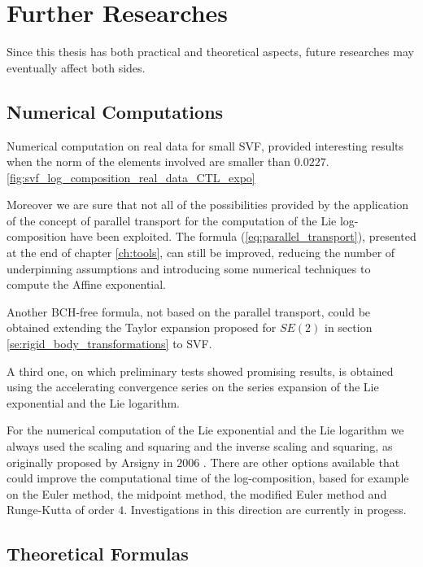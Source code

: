 \section{Further Researches}\label{se:further_research}

Since this thesis has both practical and theoretical aspects, future researches may eventually affect both sides.

\subsection{Numerical Computations} 

Numerical computation on real data for small SVF, provided interesting results when the norm of the elements involved are smaller than $0.0227$.
\ref{fig:svf_log_composition_real_data_CTL_expo}

Moreover we are sure that not all of the possibilities provided by the application of the concept of parallel transport for the computation of the Lie log-composition have been exploited. The formula (\ref{eq:parallel_transport}), presented at the end of chapter \ref{ch:tools}, can still be improved, reducing the number of underpinning assumptions and introducing some numerical techniques to compute the Affine exponential.

Another BCH-free formula, not based on the parallel transport, could be obtained extending the Taylor expansion proposed for $SE(2)$ in section \ref{se:rigid_body_transformations} to SVF.

A third one, on which  preliminary tests showed promising results, is obtained using the accelerating convergence series \cite{cohen2000convergence} on the series expansion of the Lie exponential and the Lie logarithm. 

For the numerical computation of the Lie exponential and the Lie logarithm we always used the scaling and squaring and the inverse scaling and squaring, as originally proposed by Arsigny in $2006$ \cite{arsigny2006log}. There are other options available that could improve the computational time of the log-composition, based for example on the Euler method, the midpoint method, the modified Euler method and Runge-Kutta of order $4$. Investigations in this direction are currently in progess.


\subsection{Theoretical Formulas}

